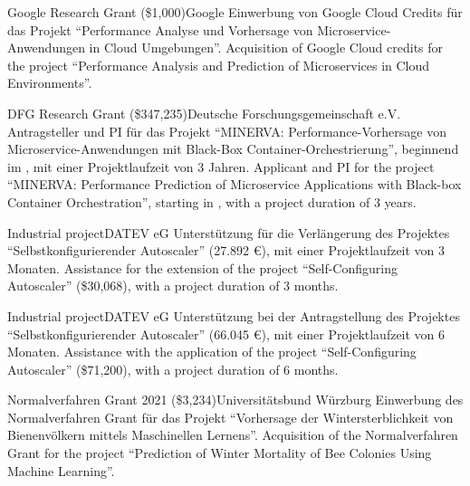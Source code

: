 
\begin{cventries}

	{Google Research Grant (\$1,000)}{Google}%
	{}%
	{Einwerbung von Google Cloud Credits für das Projekt ``Performance Analyse und Vorhersage von Microservice-Anwendungen in Cloud Umgebungen''.}%
    {Acquisition of Google Cloud credits for the project ``Performance Analysis and Prediction of Microservices in Cloud Environments''.}

	{DFG Research Grant (\$347,235)}{Deutsche Forschungsgemeinschaft e.V.}%
	{}%
	{Antragsteller und PI für das Projekt ``MINERVA: Performance-Vorhersage von Microservice-Anwendungen mit Black-Box
Container-Orchestrierung'', beginnend im , mit einer Projektlaufzeit von 3 Jahren.}%
    {Applicant and PI for the project ``MINERVA: Performance Prediction of Microservice Applications with Black-box Container Orchestration'', starting in , with a project duration of 3 years.}

	{Industrial project}{DATEV eG}%
	{}%
	{Unterstützung für die Verlängerung des Projektes ``Selbstkonfigurierender Autoscaler'' (27.892 €), mit einer Projektlaufzeit von 3 Monaten.}%
    {Assistance for the extension of the project ``Self-Configuring Autoscaler'' (\$30,068), with a project duration of 3 months.}

	{Industrial project}{DATEV eG}%
	{}%
	{Unterstützung bei der Antragstellung des Projektes ``Selbstkonfigurierender Autoscaler'' (66.045 €), mit einer Projektlaufzeit von 6 Monaten.}%
    {Assistance with the application of the project ``Self-Configuring Autoscaler'' (\$71,200), with a project duration of 6 months.}

	{Normalverfahren Grant 2021 (\$3,234)}{Universitätsbund Würzburg}%
	{}%
	{Einwerbung des Normalverfahren Grant für das Projekt ``Vorhersage der Wintersterblichkeit von Bienenvölkern
mittels Maschinellen Lernens''.}%
    {Acquisition of the Normalverfahren Grant for the project ``Prediction of Winter Mortality of Bee Colonies Using Machine Learning''.}

\end{cventries}
